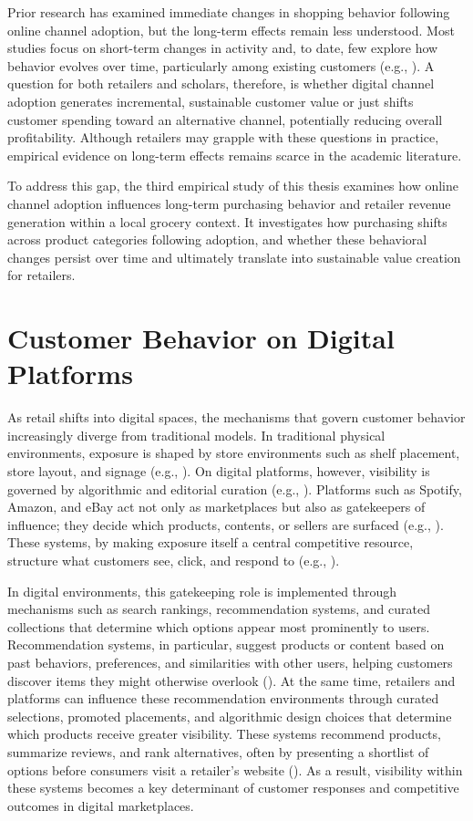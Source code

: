 Prior research has examined immediate changes in shopping behavior following online channel adoption, but the long-term effects remain less understood. Most studies focus on short-term changes in activity and, to date, few explore how behavior evolves over time, particularly among existing customers (e.g., \cite{Campo2020-xu, Wang2015-vc}). A question for both retailers and scholars, therefore, is whether digital channel adoption generates incremental, sustainable customer value or just shifts customer spending toward an alternative channel, potentially reducing overall profitability. Although retailers may grapple with these questions in practice, empirical evidence on long-term effects remains scarce in the academic literature.

To address this gap, the third empirical study of this thesis examines how online channel adoption influences long-term purchasing behavior and retailer revenue generation within a local grocery context. It investigates how purchasing shifts across product categories following adoption, and whether these behavioral changes persist over time and ultimately translate into sustainable value creation for retailers.

\section{Customer Behavior on Digital Platforms}
\label{sec:lit_platform}
As retail shifts into digital spaces, the mechanisms that govern customer behavior increasingly diverge from traditional models. In traditional physical environments, exposure is shaped by store environments such as shelf placement, store layout, and signage (e.g., \cite{Baker2002-ut,Donovan1994-af}). On digital platforms, however, visibility is governed by algorithmic and editorial curation (e.g., \cite{Aguiar2021-ju}). Platforms such as Spotify, Amazon, and eBay act not only as marketplaces but also as gatekeepers of influence; they decide which products, contents, or sellers are surfaced (e.g., \cite{Jurgensmeier2025-yh,Rietveld2019-yu}). These systems, by making exposure itself a central competitive resource, structure what customers see, click, and respond to (e.g., \cite{Rietveld2021-yz,Zhang2022-wi}).

In digital environments, this gatekeeping role is implemented through mechanisms such as search rankings, recommendation systems, and curated collections that determine which options appear most prominently to users. Recommendation systems, in particular, suggest products or content based on past behaviors, preferences, and similarities with other users, helping customers discover items they might otherwise overlook (\cite{Gai2019-iy}). At the same time, retailers and platforms can influence these recommendation environments through curated selections, promoted placements, and algorithmic design choices that determine which products receive greater visibility. These systems recommend products, summarize reviews, and rank alternatives, often by presenting a shortlist of options before consumers visit a retailer’s website (\cite{Bain-Company2025-hz}). As a result, visibility within these systems becomes a key determinant of customer responses and competitive outcomes in digital marketplaces.


